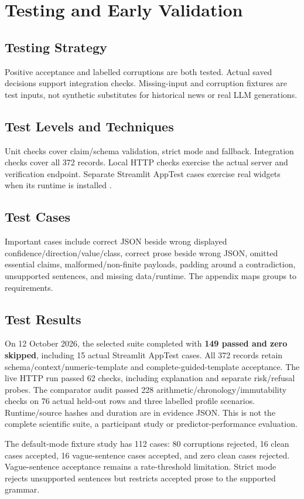 \chapter{Testing and Early Validation}
\section{Testing Strategy}
Positive acceptance and labelled corruptions are both tested. Actual saved decisions support integration checks. Missing-input and corruption fixtures are test inputs, not synthetic substitutes for historical news or real LLM generations.
\section{Test Levels and Techniques}
Unit checks cover claim/schema validation, strict mode and fallback. Integration checks cover all 372 records. Local HTTP checks exercise the actual server and verification endpoint. Separate Streamlit AppTest cases exercise real widgets when its runtime is installed \cite{streamlit_apptest}.
\section{Test Cases}
Important cases include correct JSON beside wrong displayed confidence/direction/value/class, correct prose beside wrong JSON, omitted essential claims, malformed/non-finite payloads, padding around a contradiction, unsupported sentences, and missing data/runtime. The appendix maps groups to requirements.
\section{Test Results}
On 12 October 2026, the selected suite completed with \textbf{149 passed and zero skipped}, including 15 actual Streamlit AppTest cases. All 372 records retain schema/context/numeric-template and complete-guided-template acceptance. The live HTTP run passed 62 checks, including explanation and separate risk/refusal probes. The comparator audit passed 228 arithmetic/chronology/immutability checks on 76 actual held-out rows and three labelled profile scenarios. Runtime/source hashes and duration are in evidence JSON. This is not the complete scientific suite, a participant study or predictor-performance evaluation.

The default-mode fixture study has 112 cases: 80 corruptions rejected, 16 clean cases accepted, 16 vague-sentence cases accepted, and zero clean cases rejected. Vague-sentence acceptance remains a rate-threshold limitation. Strict mode rejects unsupported sentences but restricts accepted prose to the supported grammar.
